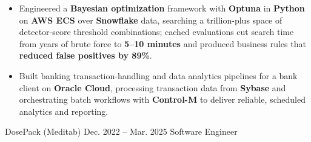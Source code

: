 \begin{itemize}
  \item Engineered a \textbf{Bayesian optimization} framework with \textbf{Optuna} in \textbf{Python} on \textbf{AWS ECS} over \textbf{Snowflake} data, searching a trillion-plus space of detector-score threshold combinations; cached evaluations cut search time from years of brute force to \textbf{5–10 minutes} and produced business rules that \textbf{reduced false positives by 89\%}.
  \item Built banking transaction-handling and data analytics pipelines for a bank client on \textbf{Oracle Cloud}, processing transaction data from \textbf{Sybase} and orchestrating batch workflows with \textbf{Control-M} to deliver reliable, scheduled analytics and reporting.
\end{itemize}

\resumeSubheading
  {DosePack (Meditab)}
  {Dec. 2022 – Mar. 2025}
  {Software Engineer}
  {}
